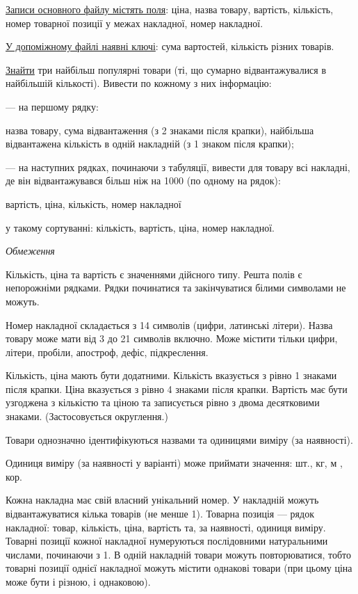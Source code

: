 \documentclass[11pt, ukrainian]{article}
\begin{document}
\underline{Записи основного файлу містять поля}: ціна, назва товару, вартість, кількість, номер товарної позиції у межах накладної, номер накладної.

\underline{У допоміжному файлі наявні ключі}: сума вартостей, кількість різних товарів.

\underline{Знайти} три найбільш популярні товари (ті, що сумарно відвантажувалися в найбільшій кількості). Вивести по кожному з них інформацію:\par
{\noindent}--- на першому рядку:\par
назва товару, сума відвантаження (з 2 знаками після крапки), найбільша відвантажена кількість в одній накладній (з 1 знаком після крапки);

{\noindent}--- на наступних рядках, починаючи з табуляції, вивести для товару всі накладні, де він відвантажувався більш ніж на 1000 (по одному на рядок):\par
вартість, ціна, кількість, номер накладної

{\noindent}у такому сортуванні: кількість, вартість, ціна, номер накладної.


\bigskip\textit{Обмеження}

Кількість, ціна та вартість є значеннями дійсного типу.
Решта полів є непорожніми рядками.
Рядки починатися та закінчуватися білими символами не можуть.

Номер накладної складається з 14 символів (цифри, латинські літери).
Назва товару може мати від 3 до 21 символів включно.
Може містити тільки цифри, літери, пробіли, апостроф, дефіс, підкреслення.

Кількість, ціна мають бути додатними.
Кількість вказується з рівно 1 знаками після крапки.
Ціна вказується з рівно 4 знаками після крапки.
Вартість має бути узгоджена з кількістю та ціною та записується рівно з двома десятковими знаками.
(Застосовується округлення.)

Товари однозначно ідентифікуються назвами та одиницями виміру (за наявності).

Одиниця виміру (за наявності у варіанті) може приймати значення: шт., кг, м , кор.

Кожна накладна має свій власний унікальний номер.
У накладній можуть відвантажуватися кілька товарів (не менше 1).
Товарна позиція --- рядок накладної: товар, кількість, ціна, вартість та, за наявності, одиниця виміру.
Товарні позиції кожної накладної нумеруються послідовними натуральними числами, починаючи з 1.
В одній накладній товари можуть повторюватися, 
тобто товарні позиції однієї накладної можуть містити однакові товари 
(при цьому ціна може бути і різною, і однаковою).
\end{document}
